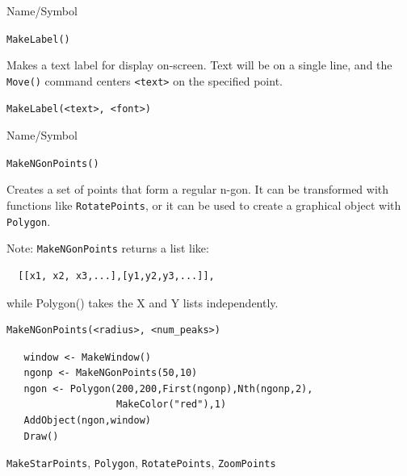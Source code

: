 \begin{desc}{Name/Symbol}
\item[Name/Symbol]	\verb+MakeLabel()+

\item[Description] Makes a text label for display on-screen. Text will
  be on a single line, and the \verb+Move()+ command centers
  \verb+<text>+ on the specified point.

\item[Usage]
\begin{verbatim}
MakeLabel(<text>, <font>)
\end{verbatim}

\item[Example]	

\item[See Also]	
\end{desc}
\begin{desc}{Name/Symbol}
\item[Name/Symbol]	\verb+MakeNGonPoints()+

\item[Description] 
Creates a set of points that form a regular n-gon.  It can be
transformed with functions like \verb+RotatePoints+, or it can be 
used to create a graphical object with \verb+Polygon+.

Note: \verb+MakeNGonPoints+ returns a list like:
\begin{verbatim}
  [[x1, x2, x3,...],[y1,y2,y3,...]],
\end{verbatim}
while Polygon() takes the X and Y lists independently.

\item[Usage]
\begin{verbatim}
MakeNGonPoints(<radius>, <num_peaks>)
\end{verbatim}

\item[Example]	
\begin{verbatim}
   window <- MakeWindow()
   ngonp <- MakeNGonPoints(50,10)
   ngon <- Polygon(200,200,First(ngonp),Nth(ngonp,2),
                   MakeColor("red"),1)
   AddObject(ngon,window)
   Draw()
\end{verbatim}

\item[See Also]	
\verb+MakeStarPoints+, \verb+Polygon+, \verb+RotatePoints+, \verb+ZoomPoints+
\end{desc}

